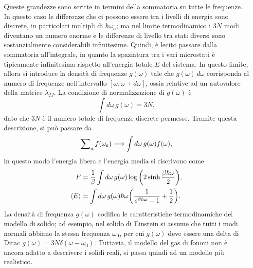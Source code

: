 Queste grandezze sono scritte in termini della sommatoria su tutte le frequenze. In questo caso le differenze che ci possono essere tra i livelli di energia sono discrete, in particolari multipli di $\hbar\omega_a$; ma nel limite termodinamico i $3N$ modi diventano un numero enorme e le differenze di livello tra stati diversi sono sostanzialmente considerabili infinitesime. Quindi, è lecito passare dalla sommatoria all'integrale, in quanto la spaziatura
tra i vari microstati è tipicamente infinitesima rispetto all'energia totale $E$ del sistema. In questo limite, allora si introduce la densità di frequenze $g(\omega)$ tale che $g(\omega)\,d\omega$ corrisponda al numero di frequenze nell'intervallo $[\omega,\omega + d\omega]$, ossia relative ad un autovalore della matrice $\lambda_{IJ}$. La condizione di normalizzazione di $g(\omega)$ è 
\begin{equation}
\label{eq: condizione normalizzazione g(omega)}
    \int d\omega\,g(\omega) = 3N,
\end{equation}
dato che $3N$ è il numero totale di frequenze discrete permesse. Tramite questa descrizione, si può passare da
\begin{equation}
    \sum\nolimits_af(\omega_a) \longrightarrow \int d\omega\,g(\omega)f(\omega),
\end{equation}
in questo modo l'energia libera e l'energia media si riscrivono come
\begin{align}
    F &= \frac{1}{\beta}\int d\omega\,g(\omega)\log{\bigg(2\sinh{\frac{\beta\hbar\omega}{2}}\bigg)}, \\
    \langle E \rangle &= \int d\omega\,g(\omega)\hbar\omega\bigg(\frac{1}{e^{\beta\hbar\omega} - 1} + \frac{1}{2}\bigg).
\end{align}
La densità di frequenza $g(\omega)$ codifica le caratteristiche termodinamiche del modello di solido; ad esempio, nel solido di Einstein si assume che tutti i modi normali abbiano la stessa frequenza $\omega_0$, per cui $g(\omega)$ deve essere una delta di Dirac $g(\omega) = 3N\delta(\omega - \omega_0)$. Tuttavia, il modello del gas di fononi non è ancora adatto a descrivere i solidi reali, si passa quindi ad un modello più realistico.

